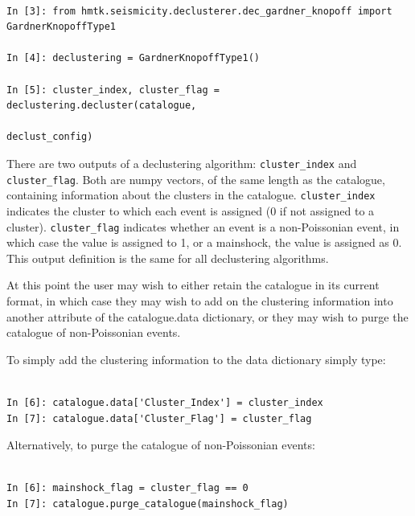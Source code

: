 \begin{Verbatim}[frame=single, commandchars=\\\{\}, fontsize=\scriptsize, samepage=true]

In [3]: from hmtk.seismicity.declusterer.dec_gardner_knopoff import GardnerKnopoffType1

In [4]: declustering = GardnerKnopoffType1()

In [5]: cluster_index, cluster_flag = declustering.decluster(catalogue,
                                                             declust_config)

\end{Verbatim}

There are two outputs of a declustering algorithm: \verb=cluster_index= and \verb=cluster_flag=. Both are numpy vectors, of the same length as the catalogue, containing information about the clusters in the catalogue. \verb=cluster_index= indicates the cluster to which each event is assigned (0 if not assigned to a cluster). \verb=cluster_flag= indicates whether an event is a non-Poissonian event, in which case the value is assigned to 1, or a mainshock, the value is assigned as 0. This output definition is the same for all declustering algorithms.

At this point the user may wish to either retain the catalogue in its current format, in which case they may wish to add on the clustering information into another attribute of the catalogue.data dictionary, or they may wish to purge the catalogue of non-Poissonian events. 

To simply add the clustering information to the data dictionary simply type:

\begin{Verbatim}[frame=single, commandchars=\\\{\}, fontsize=\scriptsize, samepage=true]

In [6]: catalogue.data['Cluster_Index'] = cluster_index
In [7]: catalogue.data['Cluster_Flag'] = cluster_flag

\end{Verbatim}
 
Alternatively, to purge the catalogue of non-Poissonian events:

\begin{Verbatim}[frame=single, commandchars=\\\{\}, fontsize=\scriptsize, samepage=true]

In [6]: mainshock_flag = cluster_flag == 0
In [7]: catalogue.purge_catalogue(mainshock_flag)

\end{Verbatim}


